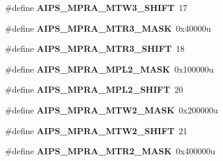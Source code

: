 \begin{DoxyCompactItemize}
\item 
\#define {\bfseries A\+I\+P\+S\+\_\+\+M\+P\+R\+A\+\_\+\+M\+T\+W3\+\_\+\+S\+H\+I\+FT}~17\hypertarget{group__AIPS__Register__Masks_gaa8977d2ad62651772db08080130c288a}{}\label{group__AIPS__Register__Masks_gaa8977d2ad62651772db08080130c288a}

\item 
\#define {\bfseries A\+I\+P\+S\+\_\+\+M\+P\+R\+A\+\_\+\+M\+T\+R3\+\_\+\+M\+A\+SK}~0x40000u\hypertarget{group__AIPS__Register__Masks_ga373ba49149f837bf7a4e6fc4919edf5c}{}\label{group__AIPS__Register__Masks_ga373ba49149f837bf7a4e6fc4919edf5c}

\item 
\#define {\bfseries A\+I\+P\+S\+\_\+\+M\+P\+R\+A\+\_\+\+M\+T\+R3\+\_\+\+S\+H\+I\+FT}~18\hypertarget{group__AIPS__Register__Masks_ga5c05eee95b3f5fd8cc95ee16d2963a77}{}\label{group__AIPS__Register__Masks_ga5c05eee95b3f5fd8cc95ee16d2963a77}

\item 
\#define {\bfseries A\+I\+P\+S\+\_\+\+M\+P\+R\+A\+\_\+\+M\+P\+L2\+\_\+\+M\+A\+SK}~0x100000u\hypertarget{group__AIPS__Register__Masks_ga6fa61f1f86b84741e5a4e3484a3906d6}{}\label{group__AIPS__Register__Masks_ga6fa61f1f86b84741e5a4e3484a3906d6}

\item 
\#define {\bfseries A\+I\+P\+S\+\_\+\+M\+P\+R\+A\+\_\+\+M\+P\+L2\+\_\+\+S\+H\+I\+FT}~20\hypertarget{group__AIPS__Register__Masks_ga09c44f94729b70aab309dcbbd100071d}{}\label{group__AIPS__Register__Masks_ga09c44f94729b70aab309dcbbd100071d}

\item 
\#define {\bfseries A\+I\+P\+S\+\_\+\+M\+P\+R\+A\+\_\+\+M\+T\+W2\+\_\+\+M\+A\+SK}~0x200000u\hypertarget{group__AIPS__Register__Masks_ga22f665d4b34bc36d18f7840834c2d8ec}{}\label{group__AIPS__Register__Masks_ga22f665d4b34bc36d18f7840834c2d8ec}

\item 
\#define {\bfseries A\+I\+P\+S\+\_\+\+M\+P\+R\+A\+\_\+\+M\+T\+W2\+\_\+\+S\+H\+I\+FT}~21\hypertarget{group__AIPS__Register__Masks_gacba4e2743a846f34382eb36a1b5b96fb}{}\label{group__AIPS__Register__Masks_gacba4e2743a846f34382eb36a1b5b96fb}

\item 
\#define {\bfseries A\+I\+P\+S\+\_\+\+M\+P\+R\+A\+\_\+\+M\+T\+R2\+\_\+\+M\+A\+SK}~0x400000u\hypertarget{group__AIPS__Register__Masks_ga2f0788074eb8af6b49e1e4731657d51d}{}\label{group__AIPS__Register__Masks_ga2f0788074eb8af6b49e1e4731657d51d}


\end{DoxyCompactItemize}
